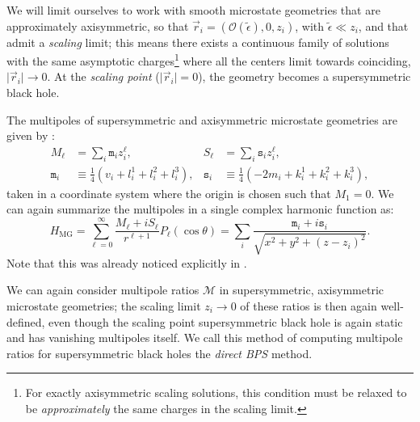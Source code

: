 \documentclass[12pt,a4paper]{article}
\newcommand{\be}{\begin{equation}}
\newcommand{\ee}{\end{equation}}
\newcommand{\mm}{\mathtt{m}}
\newcommand{\sm}{\mathtt{s}}
\def\direct{\emph{direct BPS} }
\begin{document}

We will limit ourselves to work with smooth microstate geometries that are approximately axisymmetric, so that $\vec{r}_i=(\mathcal{O}(\tilde{\epsilon}),0,z_i)$, with $\tilde{\epsilon}\ll z_i$, and that admit a \emph{scaling} limit; this means there exists a continuous family of solutions with the same asymptotic charges\footnote{For exactly axisymmetric scaling solutions, this condition must be relaxed to be \emph{approximately} the same charges in the scaling limit.} where all the centers limit towards coinciding, $\lvert\vec{r}_i\rvert\rightarrow 0$. At the \emph{scaling point} ($\lvert\vec{r}_i\rvert=0$), the geometry becomes a supersymmetric black hole.

The multipoles of supersymmetric and axisymmetric microstate geometries are given by \cite{Bena:2020see,Bena:2020uup}:
\begin{align} \label{eq:MGmultipoles} M_\ell &= \sum_i \mm_i z_i^\ell, & S_\ell &= \sum_i \sm_i z_i^\ell,\\
 \mm_i & \equiv \frac14 \left( v_i + l^1_i + l^2_i + l^3_i\right), & \sm_i &\equiv \frac14\left( -2m_i + k^1_i + k^2_i + k^3_i\right), 
\end{align}
taken in a coordinate system where the origin is chosen such that $M_1 =0$. We can again summarize the multipoles in a single complex harmonic function as:
\be\label{eq:HMG} H_{\text{MG}} =  \sum_{\ell=0}^\infty \frac{M_\ell + i S_\ell}{r^{\ell+1}}P_{\ell}(\cos\theta) = \sum_i \frac{\mm_i + i \sm_i}{\sqrt{x^2+y^2+(z-z_i)^2}}.\ee
Note that this was already noticed explicitly in \cite{Bianchi:2020bxa,Bianchi:2020miz}.

We can again consider multipole ratios $\mathcal{M}$ in supersymmetric, axisymmetric microstate geometries; the scaling limit $z_i\rightarrow 0$ of these ratios is then again well-defined, even though the scaling point supersymmetric black hole is again static and has vanishing multipoles itself. We call this method of computing multipole ratios for supersymmetric black holes the \direct method.
\end{document}
